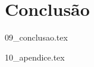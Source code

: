 \documentclass[
  oneside,
  11pt, a4paper,
  footinclude=true,
  headinclude=true,
  cleardoublepage=empty
]{scrbook}
\begin{document}

	\chapter{Conclusão}
    {09_conclusao.tex}
			

	

	
    {10_apendice.tex}
	
\end{document}
